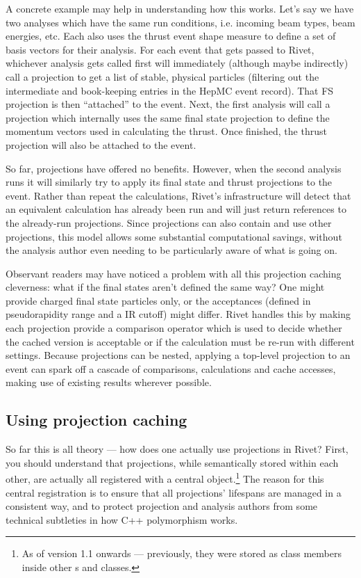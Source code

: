 A concrete example may help in understanding how this works. Let's say we have
two analyses which have the same run conditions, i.e. incoming beam types, beam
energies, etc. Each also uses the thrust event shape measure to define a set of
basis vectors for their analysis. For each event that gets passed to Rivet,
whichever analysis gets called first will immediately (although maybe
indirectly) call a  projection to get a list of stable, physical
particles (filtering out the intermediate and book-keeping entries in the HepMC
event record). That FS projection is then ``attached'' to the event. Next, the
first analysis will call a  projection which internally uses the
same final state projection to define the momentum vectors used in calculating
the thrust. Once finished, the thrust projection will also be attached to the
event.

So far, projections have offered no benefits. However, when the second analysis
runs it will similarly try to apply its final state and thrust projections to
the event. Rather than repeat the calculations, Rivet's infrastructure will
detect that an equivalent calculation has already been run and will just return
references to the already-run projections. Since projections can also contain
and use other projections, this model allows some substantial computational
savings, without the analysis author even needing to be particularly aware of
what is going on.

Observant readers may have noticed a problem with all this projection caching
cleverness: what if the final states aren't defined the same way? One might
provide charged final state particles only, or the acceptances (defined in
pseudorapidity range and a IR \pT cutoff) might differ. Rivet handles this by
making each projection provide a comparison operator which is used to decide
whether the cached version is acceptable or if the calculation must be re-run
with different settings. Because projections can be nested, applying a top-level
projection to an event can spark off a cascade of comparisons, calculations and
cache accesses, making use of existing results wherever possible.


\subsection{Using projection caching}
So far this is all theory --- how does one actually use projections in Rivet?
First, you should understand that projections, while semantically stored within
each other, are actually all registered with a central 
object.\footnote{As of version 1.1 onwards --- previously, they were stored as
  class members inside other s and  classes.}
The reason for this central registration is to ensure that all projections'
lifespans are managed in a consistent way, and to protect projection and
analysis authors from some technical subtleties in how C++ polymorphism works.

